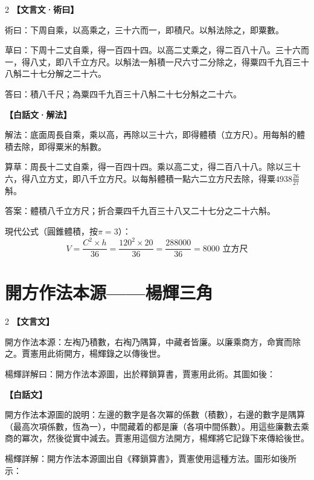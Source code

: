 \documentclass[11pt,a4paper]{article}
\newcommand{\zhc}{}[1]{{\CJKfamily{\CJKrmdefault}#1}}  %
\newcommand{\zhm}[1]{{\CJKfamily{\CJKrmdefault}#1}}  %
\newenvironment{prob bilingual}[1][]{%
  \begin{paracol}{2}%
  \setlength{\columnseprule}{0.4pt}%
}{%
  \end{paracol}%
  \medskip%
}
\begin{document}
\begin{paracol}{2}
\switchcolumn[0]
\noindent\textbf{\textcolor{notecolor}{\zhc{【文言文·術曰】}}}\par\smallskip
\zhc{
術曰：下周自乘，以高乘之，三十六而一，即積尺。以斛法除之，即粟數。

草曰：下周十二丈自乘，得一百四十四。以高二丈乘之，得二百八十八。三十六而一，得八丈，即八千立方尺。以斛法一斛積一尺六寸二分除之，得粟四千九百三十八斛二十七分解之二十六。

答曰：積八千尺；為粟四千九百三十八斛二十七分斛之二十六。
}

\switchcolumn[1]
\noindent\textbf{\textcolor{notecolor}{\zhm{【白話文·解法】}}}\par\smallskip
\zhm{
解法：底面周長自乘，乘以高，再除以三十六，即得體積（立方尺）。用每斛的體積去除，即得粟米的斛數。

算草：周長十二丈自乘，得一百四十四。乘以高二丈，得二百八十八。除以三十六，得八立方丈，即八千立方尺。以每斛體積一點六二立方尺去除，得粟$4938\frac{26}{27}$斛。

答案：體積八千立方尺；折合粟四千九百三十八又二十七分之二十六斛。

現代公式（圓錐體積，按$\pi = 3$）：
$$V = \frac{C^2 \times h}{36} = \frac{120^2 \times 20}{36} = \frac{288000}{36} = 8000 \text{ 立方尺}$$
}
\end{paracol}

\newpage

\section{\zhc{開方作法本源——楊輝三角}}
\label{sec:triangle}

\begin{paracol}{2}
\switchcolumn[0]
\noindent\textbf{\textcolor{notecolor}{\zhc{【文言文】}}}\par\smallskip
\zhc{
開方作法本源：左裪乃積數，右裪乃隅算，中藏者皆廉。以廉乘商方，命實而除之。賈憲用此術開方，楊輝錄之以傳後世。

楊輝詳解曰：開方作法本源圖，出於釋鎖算書，賈憲用此術。其圖如後：
}

\switchcolumn[1]
\noindent\textbf{\textcolor{notecolor}{\zhm{【白話文】}}}\par\smallskip
\zhm{
開方作法本源圖的說明：左邊的數字是各次冪的係數（積數），右邊的數字是隅算（最高次項係數，恆為一），中間藏着的都是廉（各項中間係數）。用這些廉數去乘商的冪次，然後從實中減去。賈憲用這個方法開方，楊輝將它記錄下來傳給後世。

楊輝詳解：開方作法本源圖出自《釋鎖算書》，賈憲使用這種方法。圖形如後所示：
}
\end{paracol}
\end{document}
